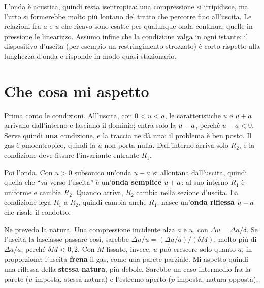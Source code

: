 L'onda è acustica, quindi resta isentropica: una compressione si irripidisce, ma l'urto si formerebbe molto più
lontano del tratto che percorre fino all'uscita. Le relazioni fra $a$ e $u$ che ricavo sono esatte per qualunque
onda continua; quelle in pressione le linearizzo. Assumo infine che la condizione valga in ogni istante: il
dispositivo d'uscita (per esempio un restringimento strozzato) è corto rispetto alla lunghezza d'onda e risponde in
modo quasi stazionario.

\section*{Che cosa mi aspetto}
Prima conto le condizioni. All'uscita, con $0<u<a$, le caratteristiche $u$ e $u+a$ arrivano dall'interno e
lasciano il dominio; entra solo la $u-a$, perché $u-a<0$. Serve quindi \textbf{una} condizione, e la traccia ne dà
una: il problema è ben posto. Il gas è omoentropico, quindi la $u$ non porta nulla. Dall'interno arriva solo
$R_2$, e la condizione deve fissare l'invariante entrante $R_1$.

Poi l'onda. Con $u>0$ subsonico un'onda $u-a$ si allontana dall'uscita, quindi quella che ``va verso l'uscita'' è
un'\textbf{onda semplice $u+a$}: al suo interno $R_1$ è uniforme e cambia $R_2$. Quando arriva, $R_2$ cambia nella
sezione d'uscita. La condizione lega $R_1$ a $R_2$, quindi cambia anche $R_1$: nasce un'\textbf{onda riflessa $u-a$}
che risale il condotto.

Ne prevedo la natura. Una compressione incidente alza $a$ e $u$, con $\Delta u=\Delta a/\delta$. Se l'uscita la
lasciasse passare così, sarebbe $\Delta u/u=(\Delta a/a)/(\delta M)$, molto più di $\Delta a/a$, perché
$\delta M<0{,}2$. Con $M$ fissato, invece, $u$ può crescere solo quanto $a$, in proporzione: l'uscita \textbf{frena}
il gas, come una parete parziale. Mi aspetto quindi una riflessa della \textbf{stessa natura}, più debole. Sarebbe un
caso intermedio fra la parete ($u$ imposta, stessa natura) e l'estremo aperto ($p$ imposta, natura opposta).

